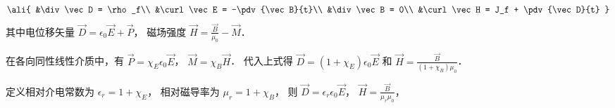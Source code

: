 
\begin{equation}\ali{
&\div\vec D = \rho_f\\
&\curl\vec E = -\pdv{\vec B}{t}\\
&\div\vec B = 0\\
&\curl\vec H = J_f + \pdv{\vec D}{t}
}\end{equation}
其中电位移矢量 $\vec D = \epsilon_0 \vec E + \vec P$，  磁场强度 $\vec H = \frac{\vec B}{\mu_0} - \vec M$．

在各向同性线性介质中，有 $\vec P = \chi_E \epsilon_0 \vec E$，  $\vec M = \chi_B \vec H$．  代入上式得 $\vec D = (1 + \chi_E)\epsilon_0\vec E$ 和  $\vec H = \frac{\vec B}{(1 + \chi_B)\mu_0}$． 

定义相对介电常数为 $\epsilon_r = 1 + \chi_E$， 相对磁导率为 $\mu_r = 1 + \chi_B$， 则 $\vec D = \epsilon_r\epsilon_0\vec E$， $\vec H = \frac{\vec B}{\mu_r\mu_0}$，  
